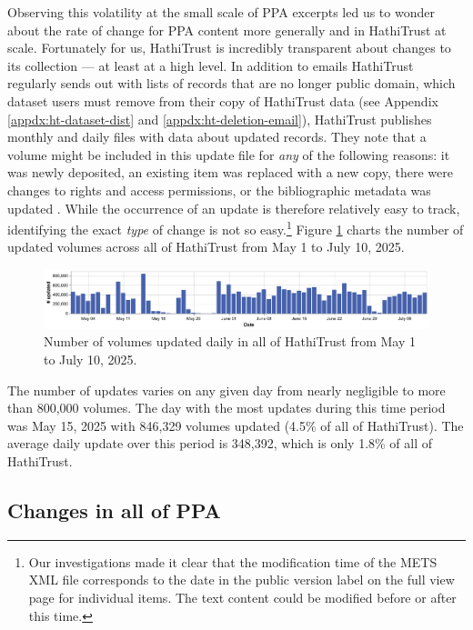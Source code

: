 \documentclass[final]{anthology-ch} %
\begin{document}
Observing this volatility at the small scale of PPA excerpts led us to wonder about the rate of change for PPA content more generally and in HathiTrust at scale. Fortunately for us, HathiTrust is incredibly transparent about changes to its collection — at least at a high level. In addition to emails HathiTrust regularly sends out with lists of records that are no longer public domain, which dataset users must remove from their copy of HathiTrust data (see Appendix \ref{appdx:ht-dataset-dist} and \ref{appdx:ht-deletion-email}), HathiTrust publishes monthly and daily files with data about updated records. They note that a volume might be included in this update file for \textit{any} of the following reasons: it was newly deposited, an existing item was replaced with a new copy, there were changes to rights and access permissions, or the bibliographic metadata was updated \cite{noauthor_hathifiles_nodate}. While the occurrence of an update is therefore relatively easy to track, identifying the exact \textit{type} of change is not so easy.\footnote{Our investigations made it clear that the modification time of the METS XML file corresponds to the date in the public version label on the full view page for individual items. The text content could be modified before or after this time. } Figure \ref{fig:hathi-daily-updates} charts the number of updated volumes across all of HathiTrust from May 1 to July 10, 2025.
\begin{figure}[t!]
    \centering
    \includegraphics[width=1\linewidth]{images/hathitrust_changes_countonly.pdf}
    \caption{Number of volumes updated daily in all of HathiTrust from May 1 to July 10, 2025.}
    \label{fig:hathi-daily-updates}
\end{figure}
The number of updates varies on any given day from nearly negligible to more than 800,000 volumes. The day with the most updates during this time period was May 15, 2025 with 846,329 volumes updated (4.5\% of all of HathiTrust). The average daily update over this period is 348,392, which is only 1.8\% of all of HathiTrust.

\subsection{Changes in all of PPA}
\end{document}

